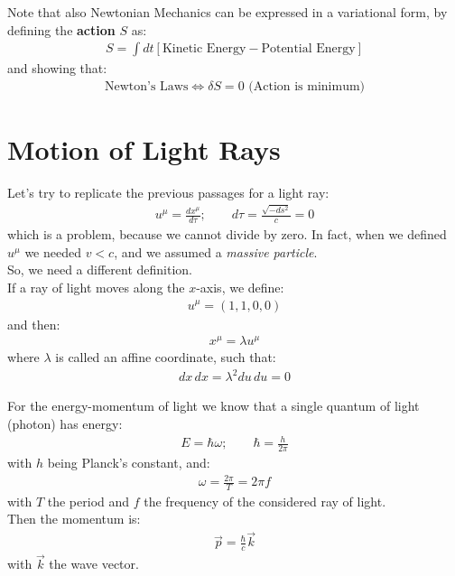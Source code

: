 \documentclass[../template.tex]{subfiles}
\begin{document}
Note that also Newtonian Mechanics can be expressed in a variational form, by defining the \textbf{action} $S$ as:
\begin{align*}
    S = \int dt [\text{Kinetic Energy} - \text{Potential Energy}]
\end{align*} 
and showing that:
\begin{align*}
    \text{Newton's Laws} \Leftrightarrow \delta S = 0 \text{ (Action is minimum)}
\end{align*}

\section{Motion of Light Rays}
Let's try to replicate the previous passages for a light ray:
\begin{align*}
    u^\mu = \frac{dx^\mu}{d \tau}; \qquad d \tau = \frac{\sqrt{-ds^2}}{c} = 0 
\end{align*}
which is a problem, because we cannot divide by zero. In fact, when we defined $u^\mu$ we needed $v < c$, and we assumed a \textit{massive particle}.\\

So, we need a different definition.\\
If a ray of light moves along the $x$-axis, we define:
\begin{align*}
    u^\mu= (1,1,0,0) 
\end{align*}
and then:
\begin{align*}
    x^\mu = \lambda u^\mu
\end{align*}
where $\lambda$ is called an affine coordinate, such that:
\begin{align*}
    dx\, dx = \lambda^2 du\,du = 0
\end{align*} 

For the energy-momentum of light we know that a single quantum of light (photon) has energy:
\begin{align*}
    E = \hbar \omega; \qquad \hbar = \frac{h}{2\pi} 
\end{align*} 
with $h$ being Planck's constant, and:
\begin{align*}
    \omega = \frac{2\pi}{T}  = 2\pi f
\end{align*}
with $T$ the period and $f$ the frequency of the considered ray of light.\\
Then the momentum is:
\begin{align*}
    \vec{p} = \frac{\hbar }{c}  \vec{k}
\end{align*}  
with $\vec{k}$ the wave vector.\\
\end{document}
